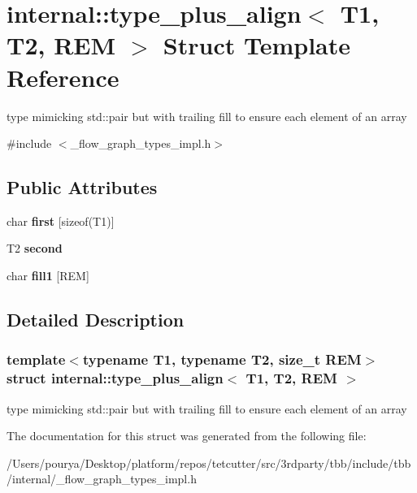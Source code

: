 \hypertarget{structinternal_1_1type__plus__align}{}\section{internal\+:\+:type\+\_\+plus\+\_\+align$<$ T1, T2, R\+E\+M $>$ Struct Template Reference}
\label{structinternal_1_1type__plus__align}


type mimicking std\+::pair but with trailing fill to ensure each element of an array  




{\ttfamily \#include $<$\+\_\+flow\+\_\+graph\+\_\+types\+\_\+impl.\+h$>$}

\subsection*{Public Attributes}
\begin{DoxyCompactItemize}
\item 
\hypertarget{structinternal_1_1type__plus__align_a08902f48c06bf3b859f45769e02facc7}{}char {\bfseries first} \mbox{[}sizeof(T1)\mbox{]}\label{structinternal_1_1type__plus__align_a08902f48c06bf3b859f45769e02facc7}

\item 
\hypertarget{structinternal_1_1type__plus__align_a5228ec28f6bcd03b1b30a51c973434b1}{}T2 {\bfseries second}\label{structinternal_1_1type__plus__align_a5228ec28f6bcd03b1b30a51c973434b1}

\item 
\hypertarget{structinternal_1_1type__plus__align_a87436c2a346cd524f691c8e4b6a17de6}{}char {\bfseries fill1} \mbox{[}R\+E\+M\mbox{]}\label{structinternal_1_1type__plus__align_a87436c2a346cd524f691c8e4b6a17de6}

\end{DoxyCompactItemize}


\subsection{Detailed Description}
\subsubsection*{template$<$typename T1, typename T2, size\+\_\+t R\+E\+M$>$struct internal\+::type\+\_\+plus\+\_\+align$<$ T1, T2, R\+E\+M $>$}

type mimicking std\+::pair but with trailing fill to ensure each element of an array 

The documentation for this struct was generated from the following file\+:\begin{DoxyCompactItemize}
\item 
/\+Users/pourya/\+Desktop/platform/repos/tetcutter/src/3rdparty/tbb/include/tbb/internal/\+\_\+flow\+\_\+graph\+\_\+types\+\_\+impl.\+h\end{DoxyCompactItemize}
